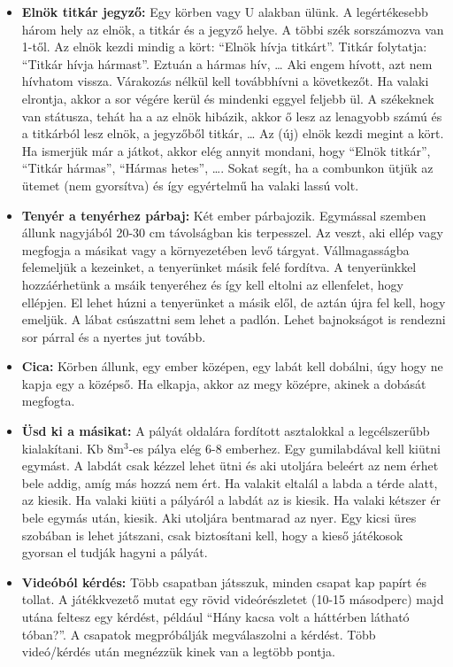 \documentclass[a4paper, 12pt, twoside, openright]{article}
\begin{document}
\begin{itemize}
\item \textbf{Elnök titkár jegyző:} 
Egy körben vagy U alakban ülünk. A legértékesebb három hely az elnök, a titkár és a jegyző helye. A többi szék sorszámozva van 1-től. Az elnök kezdi mindig a kört: ``Elnök hívja titkárt''. Titkár folytatja: ``Titkár hívja hármast''. Eztuán a hármas hív, \dots{} Aki engem hívott, azt nem hívhatom vissza. Várakozás nélkül kell továbbhívni a következőt. Ha valaki elrontja, akkor a sor végére kerül és mindenki eggyel feljebb ül. A székeknek van státusza, tehát ha a az elnök hibázik, akkor ő lesz az lenagyobb számú és a titkárból lesz elnök, a jegyzőből titkár, \dots{} Az (új) elnök kezdi megint a kört. Ha ismerjük már a játkot, akkor elég annyit mondani, hogy ``Elnök titkár'', ``Titkár hármas'', ``Hármas hetes'', \dots{}. Sokat segít, ha a combunkon ütjük az ütemet (nem gyorsítva) és így egyértelmű ha valaki lassú volt.
 
\item \textbf{Tenyér a tenyérhez párbaj:} Két ember párbajozik. Egymással szemben állunk nagyjából 20-30 cm távolságban kis terpesszel. Az veszt, aki ellép vagy megfogja a másikat vagy a környezetében levő tárgyat. Vállmagasságba felemeljük a kezeinket, a tenyerünket másik felé fordítva. A tenyerünkkel hozzáérhetünk a msáik tenyeréhez és így kell eltolni az ellenfelet, hogy ellépjen. El lehet húzni a tenyerünket a másik elől, de aztán újra fel kell, hogy emeljük. A lábat csúszattni sem lehet a padlón. Lehet bajnokságot is rendezni sor párral és a nyertes jut tovább.

\item \textbf{Cica:} Körben állunk, egy ember középen, egy labát kell dobálni, úgy hogy ne kapja egy a középső. Ha elkapja, akkor az megy középre, akinek a dobását megfogta.\\

\item \textbf{Üsd ki a másikat:} A pályát oldalára fordított asztalokkal a legcélszerűbb kialakítani. Kb 8m$^3$-es pálya elég 6-8 emberhez. Egy gumilabdával kell kiütni egymást. A labdát csak kézzel lehet ütni és aki utoljára beleért az nem érhet bele addig, amíg más hozzá nem ért. Ha valakit eltalál a labda a térde alatt, az kiesik. Ha valaki kiüti a pályáról a labdát az is kiesik. Ha valaki kétszer ér bele egymás után, kiesik. Aki utoljára bentmarad az nyer. Egy kicsi üres szobában is lehet játszani, csak biztosítani kell, hogy a kieső játékosok gyorsan el tudják hagyni a pályát.

\item \textbf{Videóból kérdés:} Több csapatban játsszuk, minden csapat kap papírt és tollat. A játékkvezető mutat egy rövid videórészletet (10-15 másodperc) majd utána feltesz egy kérdést, például ``Hány kacsa volt a háttérben látható tóban?''. A csapatok megpróbálják megválaszolni a kérdést. Több videó/kérdés után megnézzük kinek van a legtöbb pontja.


\end{itemize}
\end{document}
